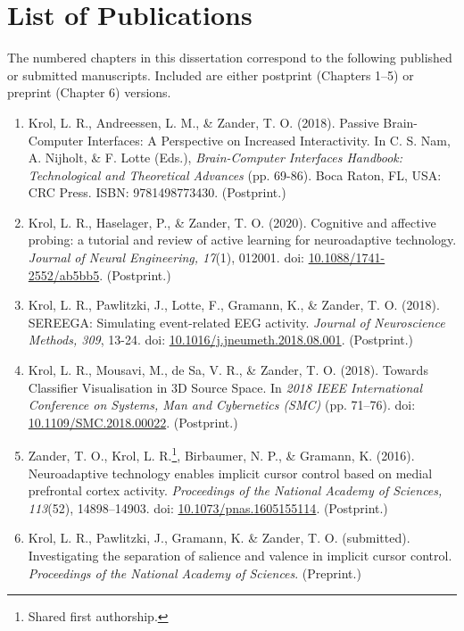 
\chapter*{List of Publications}

The numbered chapters in this dissertation correspond to the following published or submitted manuscripts. Included are either postprint (Chapters 1--5) or preprint (Chapter 6) versions.

\begin{enumerate}
    \setcounter{enumi}{0}
    \item Krol, L. R., Andreessen, L. M., \& Zander, T. O. (2018). Passive Brain-Computer Interfaces: A Perspective on Increased Interactivity. In C. S. Nam, A. Nijholt, \& F. Lotte (Eds.), \textit{Brain-Computer Interfaces Handbook: Technological and Theoretical Advances} (pp. 69-86). Boca Raton, FL, USA: CRC Press. ISBN: 9781498773430. (Postprint.)
    \item Krol, L. R., Haselager, P., \& Zander, T. O. (2020). Cognitive and affective probing: a tutorial and review of active learning for neuroadaptive technology. \textit{Journal of Neural Engineering, 17}(1), 012001. doi: \href{https://dx.doi.org/10.1088/1741-2552/ab5bb5}{10.1088/1741-2552/ab5bb5}.  (Postprint.)
    \item Krol, L. R., Pawlitzki, J., Lotte, F., Gramann, K., \& Zander, T. O. (2018). SEREEGA: Simulating event-related EEG activity. \textit{Journal of Neuroscience Methods, 309}, 13-24. doi: \href{https://dx.doi.org/10.1016/j.jneumeth.2018.08.001}{10.1016/j.jneumeth.2018.08.001}. (Postprint.)
    \item Krol, L. R., Mousavi, M., de Sa, V. R., \& Zander, T. O. (2018). Towards Classifier Visualisation in 3D Source Space. In \textit{2018 IEEE International Conference on Systems, Man and Cybernetics (SMC)} (pp. 71–76). doi: \href{https://dx.doi.org/10.1109/SMC.2018.00022}{10.1109/SMC.2018.00022}.  (Postprint.)
    \item Zander, T. O., Krol, L. R.\footnote{Shared first authorship.}, Birbaumer, N. P., \& Gramann, K. (2016). Neuroadaptive technology enables implicit cursor control based on medial prefrontal cortex activity. \textit{Proceedings of the National Academy of Sciences, 113}(52), 14898–14903. doi: \href{https://dx.doi.org/10.1073/pnas.1605155114}{10.1073/pnas.1605155114}.  (Postprint.)
    \item Krol, L. R., Pawlitzki, J., Gramann, K. \& Zander, T. O. (submitted). Investigating the separation of salience and valence in implicit cursor control. \textit{Proceedings of the National Academy of Sciences}. (Preprint.)
\end{enumerate}
